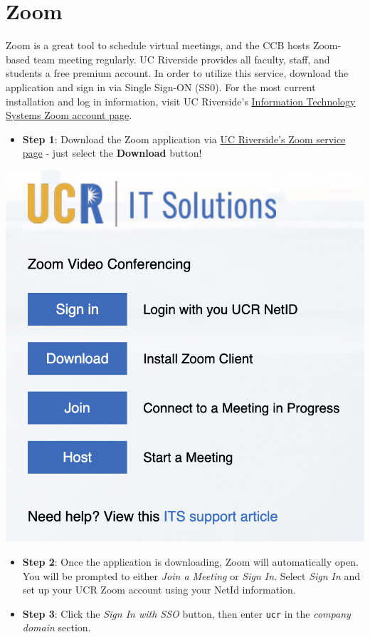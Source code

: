 \documentclass[
]{book}
\providecommand{\tightlist}{%
  \setlength{\itemsep}{0pt}\setlength{\parskip}{0pt}}
\begin{document}
\hypertarget{zoom}{%
\section{Zoom}\label{zoom}}

Zoom is a great tool to schedule virtual meetings, and the CCB hosts Zoom-based team meeting regularly. UC Riverside provides all faculty, staff, and students a free premium account. In order to utilize this service, download the application and sign in via Single Sign-ON (SS0). For the most current installation and log in information, visit UC Riverside's \href{https://its.ucr.edu/blog/2019/12/17/changes-ucr-zoom-account-access}{Information Technology Systems Zoom account page}.

\begin{itemize}
\tightlist
\item
  \textbf{Step 1}: Download the Zoom application via \href{https://ucr.zoom.us/}{UC Riverside's Zoom service page} - just select the \textbf{Download} button!
\end{itemize}

\begin{center}\includegraphics[width=12.03in]{images/zoomdownload} \end{center}

\begin{itemize}
\item
  \textbf{Step 2}: Once the application is downloading, Zoom will automatically open. You will be prompted to either \emph{Join a Meeting} or \emph{Sign In}. Select \emph{Sign In} and set up your UCR Zoom account using your NetId information.
\item
  \textbf{Step 3}: Click the \emph{Sign In with SSO} button, then enter \texttt{ucr} in the \emph{company domain} section.
\end{itemize}
\end{document}
